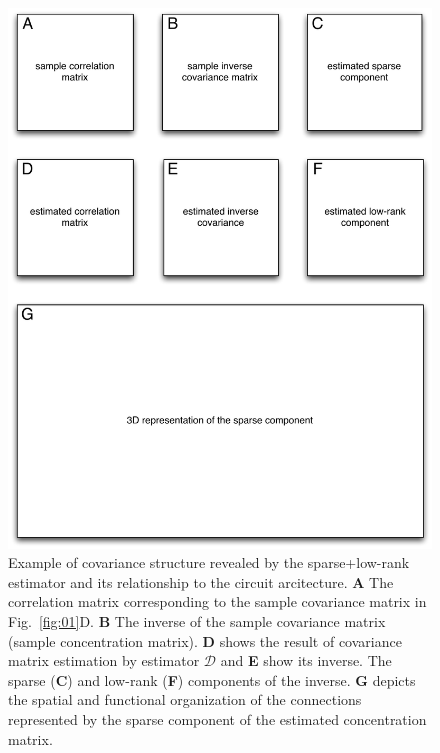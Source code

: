 \begin{figure}[htp]
\centering
\includegraphics[width=1.0\textwidth]{figures/Figure5.pdf}
\caption{
Example of covariance structure revealed by the sparse+low-rank estimator and its relationship to the circuit arcitecture.
{\bf A} The correlation matrix corresponding to the sample covariance matrix in Fig.~\ref{fig:01}D. {\bf B} The inverse of the sample covariance matrix (sample concentration matrix). {\bf D} shows the result of covariance matrix estimation by estimator $\mathcal D$ and {\bf E} show its inverse. The sparse ({\bf C}) and low-rank ({\bf F}) components of the inverse.  {\bf G} depicts the spatial and functional organization of the connections represented by the sparse component of the estimated concentration matrix. 
}
\label{fig:05}
\end{figure}
